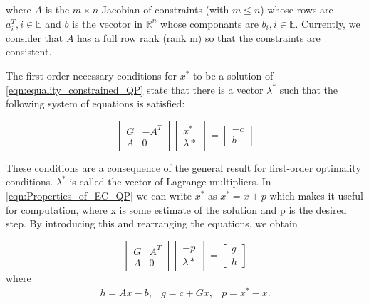 where $A$ is the $m\times n$ Jacobian of constraints (with $m\leqslant n$) whose rows are $a_i^T,i \in \mathbb{E}$ and $b$ is the vecotor in $\mathbb{R}^n$ whose componants are $b_i, i \in \mathbb{E}$. Currently, we consider that $A$ has a full row rank (rank m) so that the constraints are consistent.

The first-order necessary conditions for $x^*$ to be a solution of \ref{eqn:equality_constrained_QP} state that there is a vector $\lambda^*$ such that the following system of equations is satisfied:

\begin{equation}
\begin{bmatrix}
  	G & -A^T \\
    A & 0
  \end{bmatrix}
  \begin{bmatrix}
  	x^* \\
    \lambda{*}
  \end{bmatrix}
  =
  \begin{bmatrix}
  	-c \\
    b
  \end{bmatrix}	
  \label{eqn:Properties_of_EC_QP}
\end{equation}

These conditions are a consequence of the general result for first-order optimality conditions.  $\lambda^*$ is called the vector of Lagrange multipliers. In \ref{eqn:Properties_of_EC_QP} we can write $x^*$ as $x^* = x+p$ which makes it useful for computation, where x is some estimate of the solution and p is the desired step. By introducing this and rearranging the equations, we obtain

\begin{equation}
\begin{bmatrix}
  	G & A^T \\
    A & 0
  \end{bmatrix}
  \begin{bmatrix}
  	-p \\
    \lambda{*}
  \end{bmatrix}
  =
  \begin{bmatrix}
  	g \\
    h
  \end{bmatrix}	
  \label{eqn:Properties_of_EC_QP_2}
\end{equation}
where
\begin{equation}
\begin{aligned}
h= Ax-b, & g = c+Gx, & p = x^* - x.
\end{aligned}
\label{eqn:Properties_of_EC_QP_3}	
\end{equation}

